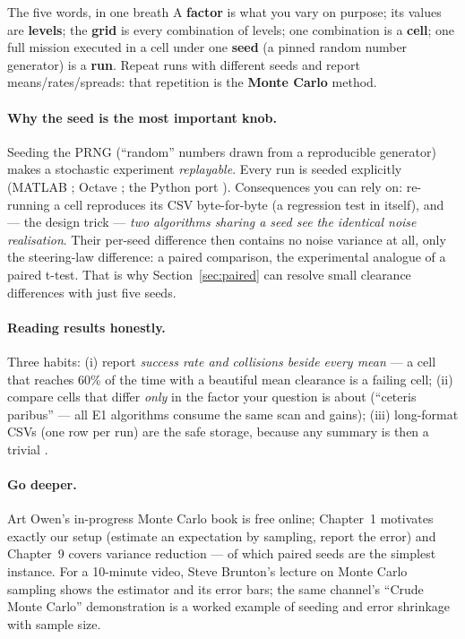 \begin{keybox}{The five words, in one breath}
A \textbf{factor} is what you vary on purpose; its values are
\textbf{levels}; the \textbf{grid} is every combination of levels; one
combination is a \textbf{cell}; one full mission executed in a cell under
one \textbf{seed} (a pinned random number generator) is a \textbf{run}.
Repeat runs with different seeds and report means/rates/spreads:
that repetition is the \textbf{Monte Carlo} method.
\end{keybox}

\paragraph{Why the seed is the most important knob.} Seeding the PRNG
(``random'' numbers drawn from a reproducible generator) makes a stochastic
experiment \emph{replayable}. Every run is seeded explicitly (MATLAB ; Octave
; the Python port ). Consequences you can rely on:
re-running a cell reproduces its CSV byte-for-byte (a regression test in
itself), and --- the design trick --- \emph{two algorithms sharing a seed
see the identical noise realisation}. Their per-seed difference then
contains no noise variance at all, only the steering-law difference: a
paired comparison, the experimental analogue of a paired t-test. That is
why Section~\ref{sec:paired} can resolve small clearance differences with
just five seeds.

\paragraph{Reading results honestly.} Three habits:
(i) report \emph{success rate and collisions beside every mean} --- a cell
that reaches 60\% of the time with a beautiful mean clearance is a failing
cell; (ii) compare cells that differ \emph{only} in the factor your question
is about (``ceteris paribus'' --- all E1 algorithms consume the same scan
and gains); (iii) long-format CSVs (one row per run) are the safe storage,
because any summary is then a trivial .

\paragraph{Go deeper.} Art Owen's in-progress Monte Carlo book
\cite{owen2019} is free online; Chapter~1 motivates exactly our setup
(estimate an expectation by sampling, report the error) and Chapter~9 covers
variance reduction --- of which paired seeds are the simplest instance. For
a 10-minute video, Steve Brunton's lecture on Monte Carlo sampling
\cite{bruntonmc} shows the estimator and its error bars; the same channel's
``Crude Monte Carlo'' demonstration \cite{bruntoncrude} is a worked example
of seeding and error shrinkage with sample size.

